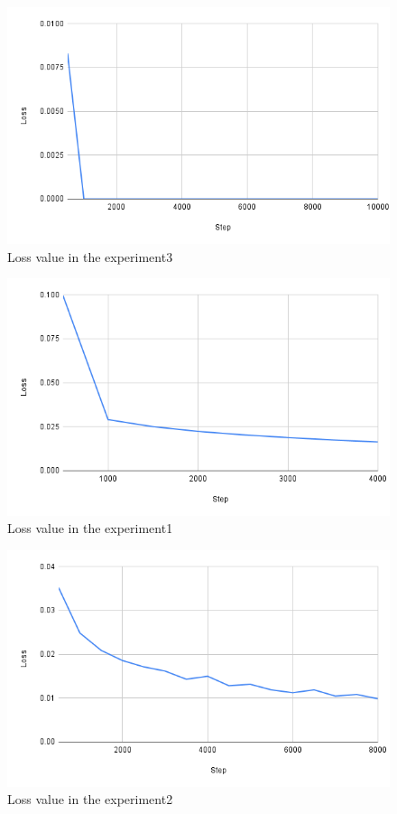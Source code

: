 \begin{figure}[h]
  \centering
  \includegraphics[keepaspectratio, scale=0.31]{images/exp2_10000.png}
  \caption{Loss value in the experiment3}
  \label{Fig:exp2.1-10000}
  \end{figure}
  
\newpage
\begin{figure}[h]
  \centering
  \includegraphics[keepaspectratio, scale=0.31]{images/exp3_4000.png}
  \caption{Loss value in the experiment1}
  \label{Fig:exp2.2-4000}
  \end{figure}

\begin{figure}[h]
  \centering
  \includegraphics[keepaspectratio, scale=0.31]{images/exp3_8000.png}
  \caption{Loss value in the experiment2}
  \label{Fig:exp2.2-8000}
  \end{figure}

